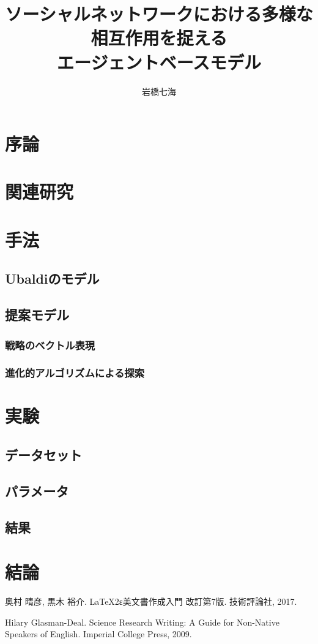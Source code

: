 \documentclass[uplatex,10pt]{ujarticle}
\title{ソーシャルネットワークにおける多様な相互作用を捉える\\エージェントベースモデル}
\author{岩橋七海}
\begin{document}
\maketitle

\section{序論}

\section{関連研究}

\section{手法}
\subsection{Ubaldiのモデル}
\subsection{提案モデル}
\subsubsection{戦略のベクトル表現}
\subsubsection{進化的アルゴリズムによる探索}

\section{実験}
\subsection{データセット}
\subsection{パラメータ}
\subsection{結果}

\section{結論}



%
%

\begin{thebibliography}{1}
奥村 晴彦, 黒木 裕介.
\newblock LaTeX2ε美文書作成入門 改訂第7版.
\newblock 技術評論社, 2017.

Hilary Glasman-Deal.
\newblock Science Research Writing: A Guide for Non-Native Speakers of English.
\newblock Imperial College Press, 2009.
\end{thebibliography}
\end{document}
